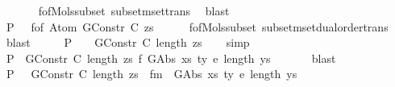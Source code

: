 \begin{isabellebody}
\ \ \ \ \ \isamarkupfalse%
\ f{\isacharunderscore}{\kern0pt}of{\isacharunderscore}{\kern0pt}Mols{\isacharunderscore}{\kern0pt}subset\ subset{\isacharunderscore}{\kern0pt}mset{\isachardot}{\kern0pt}trans\ \isamarkupfalse%
\ blast\isanewline
\ \ \isamarkupfalse%
\ \isamarkupfalse%
\ P{}{\isacharcolon}{\kern0pt}\ {\isachardoublequoteopen}{\isachardot}{\kern0pt}{\isachardot}{\kern0pt}{\isachardot}{\kern0pt}\ {\isasymsupseteq}{\isacharhash}{\kern0pt}\ f{\isacharunderscore}{\kern0pt}of\ {\isacharparenleft}{\kern0pt}Atom\ {\isacharparenleft}{\kern0pt}GConstr\ C{\isacharparenright}{\kern0pt}\ zs{\isacharparenright}{\kern0pt}{\isachardoublequoteclose}\isanewline
\ \ \ \ \isamarkupfalse%
\ f{\isacharunderscore}{\kern0pt}of{\isacharunderscore}{\kern0pt}Mols{\isacharunderscore}{\kern0pt}subset\ subset{\isacharunderscore}{\kern0pt}mset{\isachardot}{\kern0pt}dual{\isacharunderscore}{\kern0pt}order{\isachardot}{\kern0pt}trans\ \isamarkupfalse%
\ blast\isanewline
\ \ \isamarkupfalse%
\ \isamarkupfalse%
\ P{}{\isacharcolon}{\kern0pt}\ {\isachardoublequoteopen}{\isachardot}{\kern0pt}{\isachardot}{\kern0pt}{\isachardot}{\kern0pt}\ {\isasymsupseteq}{\isacharhash}{\kern0pt}\ {\isacharbraceleft}{\kern0pt}{\isacharhash}{\kern0pt}\ {\isacharparenleft}{\kern0pt}GConstr\ C{\isacharcomma}{\kern0pt}\ length\ zs{\isacharparenright}{\kern0pt}\ {\isacharhash}{\kern0pt}{\isacharbraceright}{\kern0pt}{\isachardoublequoteclose}\isanewline
\ \isamarkupfalse%
\ simp\isanewline
\isanewline
\ \ \isamarkupfalse%
\ P{}{\isacharcolon}{\kern0pt}\ {\isachardoublequoteopen}{\isasymnot}\ {\isacharparenleft}{\kern0pt}GConstr\ C{\isacharcomma}{\kern0pt}\ length\ zs{\isacharparenright}{\kern0pt}\ {\isasymsimeq}f\ {\isacharparenleft}{\kern0pt}GAbs\ xs\ ty{}\ e{\isacharcomma}{\kern0pt}\ length\ ys{\isacharparenright}{\kern0pt}{\isachardoublequoteclose}\isanewline
\ \ \ \ \ \isamarkupfalse%
\ blast\isanewline
\ \ \isamarkupfalse%
\ \isamarkupfalse%
\ P{}{\isacharcolon}{\kern0pt}\ {\isachardoublequoteopen}{\isasymnot}\ {\isacharbraceleft}{\kern0pt}{\isacharhash}{\kern0pt}\ {\isacharparenleft}{\kern0pt}GConstr\ C{\isacharcomma}{\kern0pt}\ length\ zs{\isacharparenright}{\kern0pt}\ {\isacharhash}{\kern0pt}{\isacharbraceright}{\kern0pt}\ {\isasymsimeq}fm\ {\isacharbraceleft}{\kern0pt}{\isacharhash}{\kern0pt}\ {\isacharparenleft}{\kern0pt}GAbs\ xs\ ty{}\ e{\isacharcomma}{\kern0pt}\ length\ ys{\isacharparenright}{\kern0pt}\ {\isacharhash}{\kern0pt}{\isacharbraceright}{\kern0pt}{\isachardoublequoteclose}\isanewline

\end{isabellebody}
